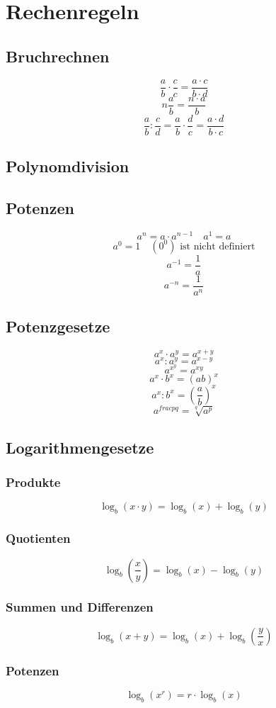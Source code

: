 \section{Rechenregeln}
\subsection{Bruchrechnen}
\[ \boxed{\frac{a}{b} \cdot \frac{c}{c} = \frac{a \cdot c}{b \cdot d}} \]
\[ \boxed{n \frac{a}{b} = \frac{n \cdot a}{b}} \]
\[ \boxed{\frac{a}{b} : \frac{c}{d} = \frac{a}{b} \cdot \frac{d}{c} = \frac{a \cdot d}{b \cdot c}} \]

\subsection{Polynomdivision}


\subsection{Potenzen}
\[ \boxed{a^n = a \cdot a^{n-1} \quad a^1 = a} \]
\[ \boxed{a^0 = 1 \quad (0^0)\text{ ist nicht definiert}} \]
\[ \boxed{a^{-1} = \frac{1}{a}} \]
\[ \boxed{a^{-n} = \frac{1}{a^n}} \]

\subsection{Potenzgesetze}
\[ \boxed{a^x \cdot a^y = a^{x+y}} \]
\[ \boxed{a^x : a^y = a^{x-y}} \]
\[ \boxed{a^{x^y} = a^{xy}} \]
\[ \boxed{a^x \cdot b^x = \left(ab\right)^x} \]
\[ \boxed{a^x : b^x = (\frac{a}{b})^x} \]
\[ \boxed{a^{frac{p}{q}} = \sqrt[q]{a^p}} \]

\subsection{Logarithmengesetze}


\subsubsection{Produkte}
\[ \boxed{\log_b(x \cdot y) = \log_b(x) + \log_b(y)} \]

\subsubsection{Quotienten}
\[ \boxed{\log_b \left( \frac{x}{y} \right) = \log_b(x) - \log_b(y)} \]

\subsubsection{Summen und Differenzen}
\[ \boxed{\log_b(x + y) = \log_b(x) + \log_b\left(\frac{y}{x}\right)} \]

\subsubsection{Potenzen}
\[ \boxed{\log_b(x^r) = r \cdot \log_b(x)} \]
